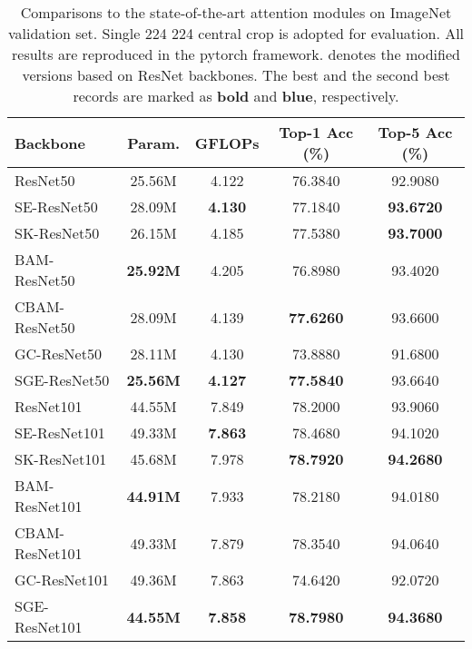 \documentclass{article}
\begin{document}
	\begin{table}
\small
		\centering
		\renewcommand\arraystretch{1.2}
		\newcommand{\tabincell}[2]{\begin{tabular}{@{}#1@{}}#2\end{tabular}}
		\caption{Comparisons to the state-of-the-art attention modules on ImageNet validation set. Single 224  224 central crop is adopted for evaluation. All results are reproduced in the pytorch framework.  denotes the modified versions based on ResNet backbones. The best and the second best records are marked as {\bf bold} and {\color{blue}\bf blue}, respectively.}
		\begin{tabular}{l|c|c|c|c}
			\hline
			Backbone&  Param. & GFLOPs & Top-1 Acc (\%) & Top-5 Acc (\%) \\
			\hline
			ResNet50 \cite{he2016deep} & 25.56M & 4.122 & 76.3840 & 92.9080 \\
			\hline
			SE-ResNet50 \cite{hu2018squeeze} & 28.09M & \bf{\color{blue}4.130} & 77.1840 & \bf{\color{blue}  93.6720}\\
			SK-ResNet50 \cite{li2019selective} & 26.15M & 4.185 & 77.5380 & \bf 93.7000\\
			BAM-ResNet50 \cite{park2018bam} & \bf{\color{blue}25.92M} & 4.205 & 76.8980 & 93.4020\\ CBAM-ResNet50 \cite{woo2018cbam} & 28.09M & 4.139 & \bf 77.6260 & 93.6600 \\ GC-ResNet50 \cite{cao2019GCNet} & 28.11M & 4.130 & 73.8880 & 91.6800 \\ SGE-ResNet50  &\bf 25.56M & \bf 4.127 & \bf{\color{blue} 77.5840} & 93.6640\\ \hline\hline
			ResNet101 \cite{he2016deep} & 44.55M & 7.849 & 78.2000 & 93.9060\\ \hline
			SE-ResNet101 \cite{hu2018squeeze} & 49.33M & \bf{\color{blue}7.863} & 78.4680 & 94.1020 \\  SK-ResNet101 \cite{li2019selective} & 45.68M & 7.978 & \bf{\color{blue}78.7920} & \bf{\color{blue}94.2680} \\
			BAM-ResNet101 \cite{park2018bam} & \bf{\color{blue}44.91M} & 7.933 & 78.2180 & 94.0180\\ CBAM-ResNet101 \cite{woo2018cbam}  & 49.33M & 7.879 & 78.3540 & 94.0640 \\ GC-ResNet101 \cite{cao2019GCNet} & 49.36M & 7.863 & 74.6420 & 92.0720 \\ SGE-ResNet101 & \bf 44.55M & \bf 7.858 & \bf 78.7980 & \bf 94.3680\\ \hline
		\end{tabular}


		\label{table_imagenet_cls}
		\vspace{-16pt}
	\end{table}
	
\end{document}
